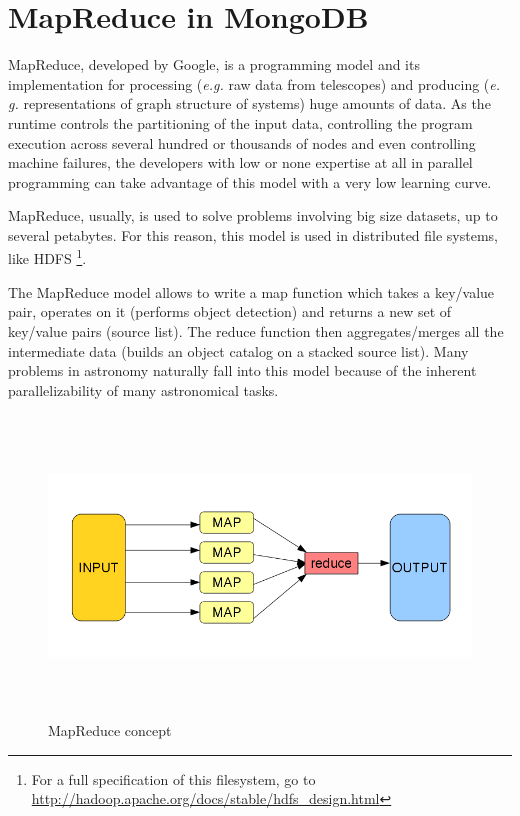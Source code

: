 \section{MapReduce in MongoDB}

MapReduce, developed by Google, is a programming model and its implementation for processing (\textit{e.g.} raw data from telescopes) and producing (\textit{e. g.} representations of graph structure of systems) huge amounts of data. As the runtime controls the partitioning of the input data, controlling the program execution across several hundred or thousands of nodes and even controlling machine failures, the developers with low or none expertise at all in parallel programming can take advantage of this model with a very low learning curve.

MapReduce, usually, is used to solve problems involving big size datasets, up to several petabytes. For this reason, this model is used in distributed file systems, like HDFS \footnote{For a full specification of this filesystem, go to \url{http://hadoop.apache.org/docs/stable/hdfs_design.html}}.

The MapReduce model allows to write a map function which takes a key/value pair, operates on it (performs object detection) and returns a new set of key/value pairs (source list). The reduce function then aggregates/merges all the intermediate data (builds an object catalog on a stacked source list). Many problems in astronomy naturally fall into this model because of the inherent parallelizability of many astronomical tasks.

\begin{figure}[H]
\centering
\includegraphics[width=16cm,height=8cm]{images/map_reduce_chart.png}
\caption{MapReduce concept}
\end{figure}

